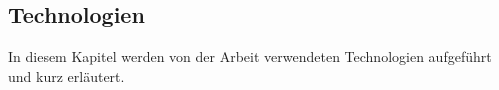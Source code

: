\subsection{Technologien}

In diesem Kapitel werden von der Arbeit verwendeten Technologien aufgeführt und kurz erläutert.





\newpage



